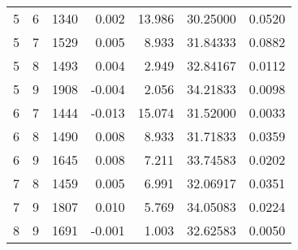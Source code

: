 \begin{longtable}{rrrrrrr}
5 & 6 & 1340 & 0.002 & 13.986 & 30.25000 & 0.0520 \\ 
5 & 7 & 1529 & 0.005 & 8.933 & 31.84333 & 0.0882 \\ 
5 & 8 & 1493 & 0.004 & 2.949 & 32.84167 & 0.0112 \\ 
5 & 9 & 1908 & -0.004 & 2.056 & 34.21833 & 0.0098 \\ 
6 & 7 & 1444 & -0.013 & 15.074 & 31.52000 & 0.0033 \\ 
6 & 8 & 1490 & 0.008 & 8.933 & 31.71833 & 0.0359 \\ 
6 & 9 & 1645 & 0.008 & 7.211 & 33.74583 & 0.0202 \\ 
7 & 8 & 1459 & 0.005 & 6.991 & 32.06917 & 0.0351 \\ 
7 & 9 & 1807 & 0.010 & 5.769 & 34.05083 & 0.0224 \\ 
8 & 9 & 1691 & -0.001 & 1.003 & 32.62583 & 0.0050 \\ 
\bottomrule
\end{longtable}

